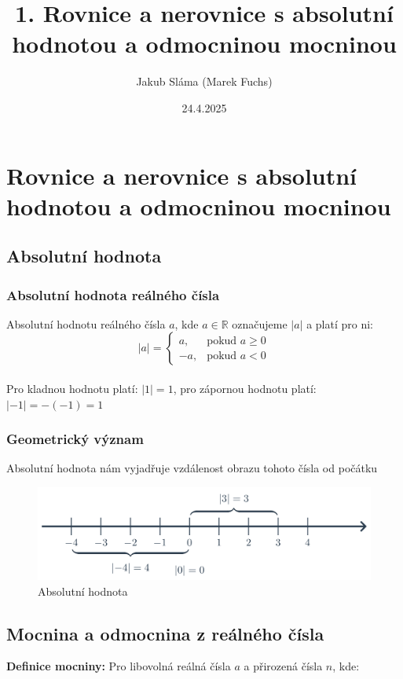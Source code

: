\title{1. Rovnice a nerovnice s absolutní hodnotou a odmocninou mocninou}
\author{Jakub Sláma (Marek Fuchs)}
\date{24.4.2025}

\maketitle



\section{Rovnice a nerovnice s absolutní hodnotou a odmocninou mocninou}

\subsection{Absolutní hodnota}
\subsubsection{Absolutní hodnota reálného čísla} 
Absolutní hodnotu reálného čísla $a$, kde $a\in\mathbb{R}$ označujeme $|a|$ a platí pro ni:
\begin{equation}
|a|=\left\{
        \begin{matrix}         
            a, & \mbox{pokud }a \ge 0\\ 
            -a, &\mbox{pokud }a < 0
         \end{matrix}\right.
\end{equation}
\\
Pro kladnou hodnotu platí: $|1|= 1$, pro zápornou hodnotu platí: $|-1| = -(-1) = 1$

\subsubsection{Geometrický význam}
Absolutní hodnota nám vyjadřuje vzdálenost obrazu tohoto čísla od počátku
    \begin{figure}[H]
        \centering
        \includegraphics[width=0.5\linewidth]{img/ilustrace-absolutni-hodnota.png}
        \caption{Absolutní hodnota}
        \label{fig:enter-label}
    \end{figure}
\subsection{Mocnina a odmocnina z reálného čísla}
\textbf{Definice mocniny: }Pro libovolná reálná čísla $a$ a přirozená čísla $n$, kde:

